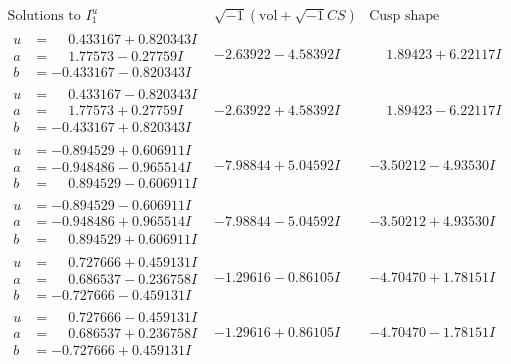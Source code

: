 \documentclass[1p]{elsarticle_modified}
\theoremstyle{definition}
\newcommand{\I}{\sqrt{-1}}
\begin{document}
$$\begin{array}{c|c|c}  
\text{Solutions to }I^u_{1}& \I (\text{vol} + \sqrt{-1}CS) & \text{Cusp shape}\\
 \hline 
\begin{aligned}
u &= \phantom{-}0.433167 + 0.820343 I \\
a &= \phantom{-}1.77573 - 0.27759 I \\
b &= -0.433167 - 0.820343 I\end{aligned}
 & -2.63922 - 4.58392 I & \phantom{-}1.89423 + 6.22117 I \\ \hline\begin{aligned}
u &= \phantom{-}0.433167 - 0.820343 I \\
a &= \phantom{-}1.77573 + 0.27759 I \\
b &= -0.433167 + 0.820343 I\end{aligned}
 & -2.63922 + 4.58392 I & \phantom{-}1.89423 - 6.22117 I \\ \hline\begin{aligned}
u &= -0.894529 + 0.606911 I \\
a &= -0.948486 - 0.965514 I \\
b &= \phantom{-}0.894529 - 0.606911 I\end{aligned}
 & -7.98844 + 5.04592 I & -3.50212 - 4.93530 I \\ \hline\begin{aligned}
u &= -0.894529 - 0.606911 I \\
a &= -0.948486 + 0.965514 I \\
b &= \phantom{-}0.894529 + 0.606911 I\end{aligned}
 & -7.98844 - 5.04592 I & -3.50212 + 4.93530 I \\ \hline\begin{aligned}
u &= \phantom{-}0.727666 + 0.459131 I \\
a &= \phantom{-}0.686537 - 0.236758 I \\
b &= -0.727666 - 0.459131 I\end{aligned}
 & -1.29616 - 0.86105 I & -4.70470 + 1.78151 I \\ \hline\begin{aligned}
u &= \phantom{-}0.727666 - 0.459131 I \\
a &= \phantom{-}0.686537 + 0.236758 I \\
b &= -0.727666 + 0.459131 I\end{aligned}
 & -1.29616 + 0.86105 I & -4.70470 - 1.78151 I \\ \hline\begin{aligned}

\end{aligned}
\end{array}$$
\end{document}
